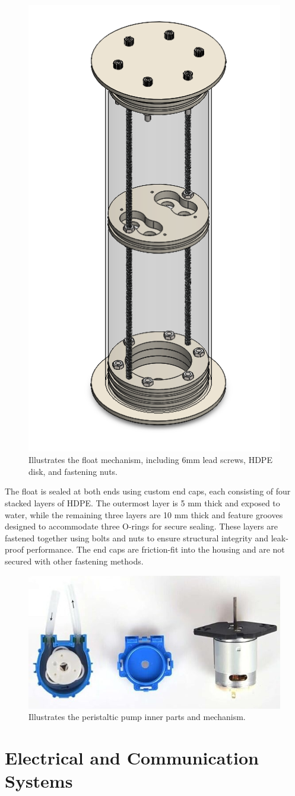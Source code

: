 \documentclass[11pt, twocolumn]{article}
\begin{document}
\begin{figure}
  \centering
  \includegraphics[width=0.39\columnwidth]{Images/Float.png}
  \caption{Illustrates the float mechanism, including 6mm lead screws, HDPE disk, and fastening nuts.}
  \label{fig:float}
\end{figure}

The float is sealed at both ends using custom end caps, each consisting of four stacked layers of HDPE. The outermost layer is 5 mm thick and exposed to water, while the remaining three layers are 10 mm thick and feature grooves designed to accommodate three O-rings for secure sealing. These layers are fastened together using bolts and nuts to ensure structural integrity and leak-proof performance. The end caps are friction-fit into the housing and are not secured with other fastening methods.

\begin{figure}[h]
  \centering
  \includegraphics[width=\columnwidth]{Images/peristaltic pump.jpg}
  \caption{Illustrates the peristaltic pump inner parts and mechanism.}
  \label{fig:pump}
\end{figure}

\section{Electrical and Communication Systems}
\end{document}
